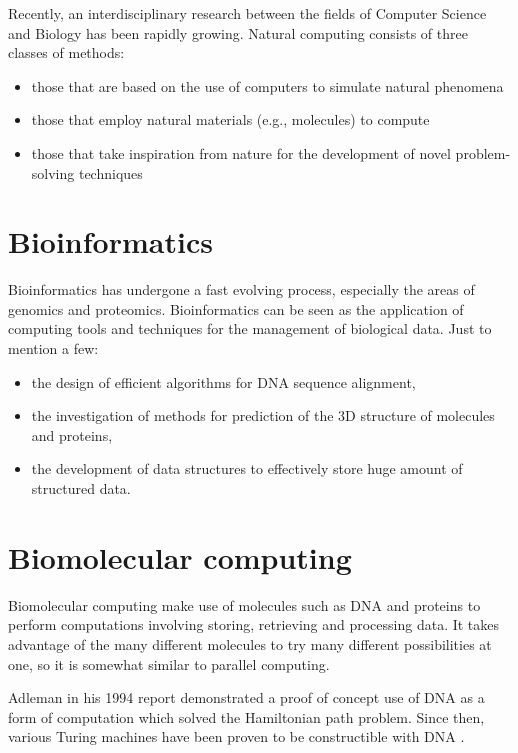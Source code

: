 Recently, an interdisciplinary research between the fields of Computer Science and Biology has been rapidly growing. Natural computing consists of three classes of methods:
\begin{itemize}
  \item those that are based on the use of computers to simulate natural phenomena
  \item those that employ natural materials (e.g., molecules) to compute
  \item those that take inspiration from nature for the development of novel problem-solving techniques
\end{itemize}


\section{Bioinformatics} %
\label{sec:bioinformatics}

Bioinformatics has undergone a fast evolving process, especially the areas of genomics and proteomics. Bioinformatics can be seen as the application of computing tools and techniques for the management of biological data. Just to mention a few:
\begin{itemize} 
  \item the design of efficient algorithms for DNA sequence alignment,
  \item the investigation of methods for prediction of the 3D structure of molecules and proteins,
  \item the development of data structures to effectively store huge amount of structured data.
\end{itemize}


\section{Biomolecular computing} %
\label{sec:biomolecular_computing}

Biomolecular computing make use of molecules such as DNA and proteins to perform computations involving storing, retrieving and processing data. It takes advantage of the many different molecules to try many different possibilities at one, so it is somewhat similar to parallel computing.

Adleman in his 1994 report \cite{Adleman1994MolecularComputation} demonstrated a proof of concept use of DNA as a form of computation which solved the Hamiltonian path problem. Since then, various Turing machines have been proven to be constructible with DNA \cite{Kari2000DNAPCP}. 


